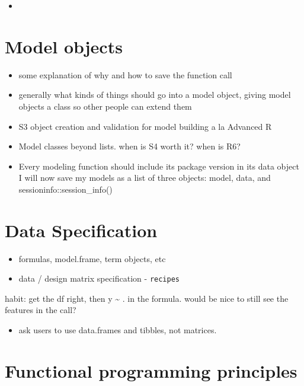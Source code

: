 \documentclass[]{book}
\providecommand{\tightlist}{%
  \setlength{\itemsep}{0pt}\setlength{\parskip}{0pt}}
\theoremstyle{definition}
\theoremstyle{definition}
\theoremstyle{definition}
\theoremstyle{remark}
\begin{document}
\begin{itemize}
\item
\end{itemize}

\chapter{Model objects}\label{model-objects}

\begin{itemize}
\item
  some explanation of why and how to save the function call
\item
  generally what kinds of things should go into a model object, giving
  model objects a class so other people can extend them
\item
  S3 object creation and validation for model building a la Advanced R
\item
  Model classes beyond lists. when is S4 worth it? when is R6?
\item
  Every modeling function should include its package version in its data
  object I will now save my models as a list of three objects: model,
  data, and sessioninfo::session\_info()
\end{itemize}

\chapter{Data Specification}\label{data-specification}

\begin{itemize}
\item
  formulas, model.frame, term objects, etc
\item
  data / design matrix specification - \texttt{recipes}
\end{itemize}

habit: get the df right, then y \textasciitilde{} . in the formula.
would be nice to still see the features in the call?

\begin{itemize}
\tightlist
\item
  ask users to use data.frames and tibbles, not matrices.
\end{itemize}

\chapter{Functional programming
principles}\label{functional-programming-principles}
\end{document}
